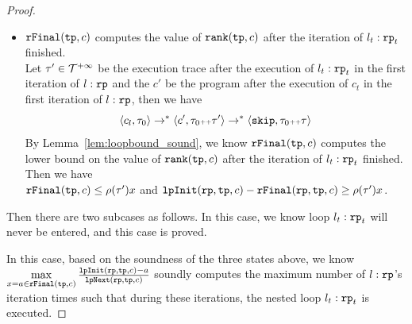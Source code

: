 \begin{proof}
\begin{itemize}
\[\begin{array}{l}
{\begin{array}{l}
                (l_1, x' \leq y + v, l_2) \in \reset(x, c) \land l_1 \in \rprog \land l_1 \notin \tpath\right\}
            \\ 
            - \sum\limits_{ \absevent \in \dec(x, c) }\left\{ 
            v 
            ~\middle\vert~ \absevent = (l', x' \leq x + v, \_) \land l' \in \rprog \land l' \notin \tpath \right\}
            \\
            + BD(l_t: \rprog_t) \times \rfnext(\tpath, c)
          \end{array}
      }(\trace_0) \\
      \leq \env(\trace') x
    \end{array}
    \]
  \item $\mathtt{rFinal}(\mathtt{tp}, c)$ computes the value of $\mathtt{rank}(\mathtt{tp}, c)$ after the iteration of $l_t:\mathtt{rp}_t$ finished.
  \\
  Let $\mathtt{\tau}' \in \mathcal{T}^{+\infty}$ be the execution trace after the execution of $l_t: \mathtt{rp}_t$ in the first iteration of $l:\mathtt{rp}$ and the $c'$ be the program after the execution of $c_t$ in the first iteration of $l:\mathtt{rp}$,  then we have
  \[
    \langle c_l, \mathtt{\tau}_0 \rangle \to^* \langle c', \mathtt{\tau}_0 {\scriptscriptstyle ++} \mathtt{\tau}' \rangle \to^* \langle \mathtt{skip}, \mathtt{\tau}_0 {\scriptscriptstyle ++} \mathtt{\tau} \rangle
  \]
  By Lemma~\ref{lem:loopbound_sound}, we know $\mathtt{rFinal}(\mathtt{tp}, c)$ computes the lower bound on the value of $\mathtt{rank}(\mathtt{tp}, c)$ after the iteration of $l_t:\mathtt{rp}_t$ finished.
  \\
  Then we have 
  \\
  $\mathtt{rFinal}(\mathtt{tp}, c) \leq \rho(\mathtt{\tau}') x$ and $\mathtt{lpInit}(\mathtt{rp}, \mathtt{tp}, c) - \mathtt{rFinal}(\mathtt{rp}, \mathtt{tp}, c) \geq \rho(\mathtt{\tau}') x$.
\end{itemize}
Then there are two subcases as follows.
In this case, we know loop $l_t: \mathtt{rp}_t$ will never be entered, and this case is proved.

In this case, based on the soundness of the three states above, we know 
\\
$
  \max\limits_{x = a \in \mathtt{rFinal}(\mathtt{tp}, c)}
  \frac{\mathtt{lpInit}(\mathtt{rp}, \mathtt{tp}, c) - a }{\mathtt{lpNext}(\mathtt{rp}, \mathtt{tp}, c)}
$
soundly computes the maximum number of $l: \mathtt{rp}$'s iteration times such that during these iterations, the nested loop $l_t: \mathtt{rp}_t$ is executed.


\end{proof}
